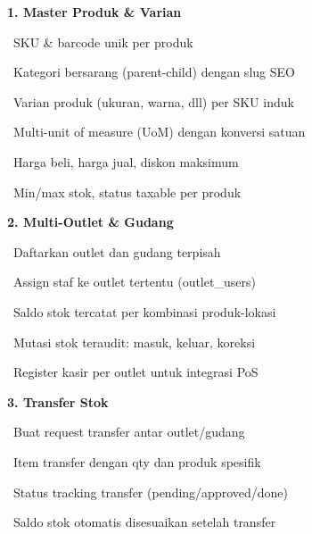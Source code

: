 \documentclass[a4paper]{article}
\begin{document}
\noindent
\begin{minipage}[t]{0.485\textwidth}

    {\fontsize{10.5}{13}\selectfont\bfseries\color{CyanPrimary} 1. Master Produk \& Varian}
    \vspace{3pt}

    {\fontsize{9}{13}\selectfont\color{TextDark}%
    \textbullet\ SKU \& barcode unik per produk\par\vspace{2pt}%
    \textbullet\ Kategori bersarang (parent-child) dengan slug SEO\par\vspace{2pt}%
    \textbullet\ Varian produk (ukuran, warna, dll) per SKU induk\par\vspace{2pt}%
    \textbullet\ Multi-unit of measure (UoM) dengan konversi satuan\par\vspace{2pt}%
    \textbullet\ Harga beli, harga jual, diskon maksimum\par\vspace{2pt}%
    \textbullet\ Min/max stok, status taxable per produk}%
    \vspace{8pt}

    {\fontsize{10.5}{13}\selectfont\bfseries\color{CyanPrimary} 2. Multi-Outlet \& Gudang}
    \vspace{3pt}

    {\fontsize{9}{13}\selectfont\color{TextDark}%
    \textbullet\ Daftarkan outlet dan gudang terpisah\par\vspace{2pt}%
    \textbullet\ Assign staf ke outlet tertentu (outlet\_users)\par\vspace{2pt}%
    \textbullet\ Saldo stok tercatat per kombinasi produk-lokasi\par\vspace{2pt}%
    \textbullet\ Mutasi stok teraudit: masuk, keluar, koreksi\par\vspace{2pt}%
    \textbullet\ Register kasir per outlet untuk integrasi PoS}%
    \vspace{8pt}

    {\fontsize{10.5}{13}\selectfont\bfseries\color{CyanPrimary} 3. Transfer Stok}
    \vspace{3pt}

    {\fontsize{9}{13}\selectfont\color{TextDark}%
    \textbullet\ Buat request transfer antar outlet/gudang\par\vspace{2pt}%
    \textbullet\ Item transfer dengan qty dan produk spesifik\par\vspace{2pt}%
    \textbullet\ Status tracking transfer (pending/approved/done)\par\vspace{2pt}%
    \textbullet\ Saldo stok otomatis disesuaikan setelah transfer}%

\end{minipage}%
\end{document}
